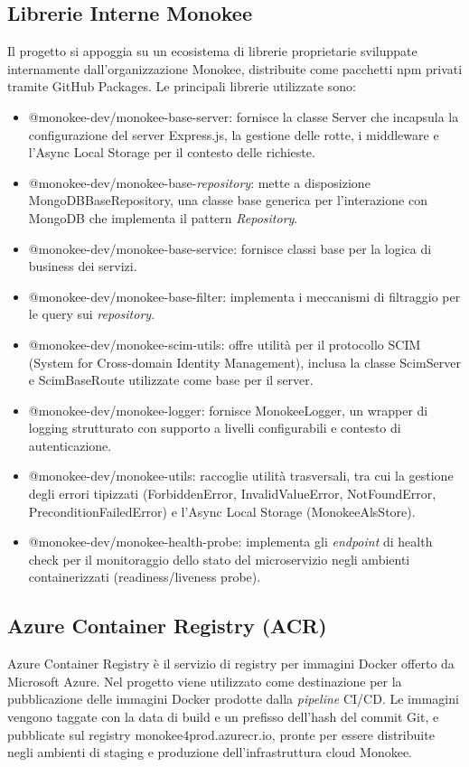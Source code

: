\subsection{Librerie Interne Monokee}
Il progetto si appoggia su un ecosistema di librerie proprietarie sviluppate internamente dall'organizzazione Monokee, distribuite come pacchetti npm privati tramite GitHub Packages. Le principali librerie utilizzate sono:
\begin{itemize}
    \item @monokee-dev/monokee-base-server: fornisce la classe Server che incapsula la configurazione del server Express.js, la gestione delle rotte, i middleware e l'Async Local Storage per il contesto delle richieste.
    \item @monokee-dev/monokee-base-\textit{repository}: mette a disposizione MongoDBBaseRepository, una classe base generica per l'interazione con MongoDB che implementa il pattern \textit{Repository}.
    \item @monokee-dev/monokee-base-service: fornisce classi base per la logica di business dei servizi.
    \item @monokee-dev/monokee-base-filter: implementa i meccanismi di filtraggio per le query sui \textit{repository}.
    \item @monokee-dev/monokee-scim-utils: offre utilità per il protocollo SCIM\glsfirstoccur{} (System for Cross-domain Identity Management), inclusa la classe ScimServer e ScimBaseRoute utilizzate come base per il server.
    \item @monokee-dev/monokee-logger: fornisce MonokeeLogger, un wrapper di logging strutturato con supporto a livelli configurabili e contesto di autenticazione.
    \item @monokee-dev/monokee-utils: raccoglie utilità trasversali, tra cui la gestione degli errori tipizzati (ForbiddenError, InvalidValueError, NotFoundError, PreconditionFailedError) e l'Async Local Storage (MonokeeAlsStore).
    \item @monokee-dev/monokee-health-probe: implementa gli \textit{endpoint} di health check per il monitoraggio dello stato del microservizio negli ambienti containerizzati (readiness/liveness probe).
\end{itemize}

\subsection{Azure Container Registry (ACR)}
Azure Container Registry è il servizio di registry per immagini Docker offerto da Microsoft Azure. Nel progetto viene utilizzato come destinazione per la pubblicazione delle immagini Docker prodotte dalla \textit{pipeline} CI/CD. Le immagini vengono taggate con la data di build e un prefisso dell'hash del commit Git, e pubblicate sul registry monokee4prod.azurecr.io, pronte per essere distribuite negli ambienti di staging e produzione dell'infrastruttura cloud Monokee.
